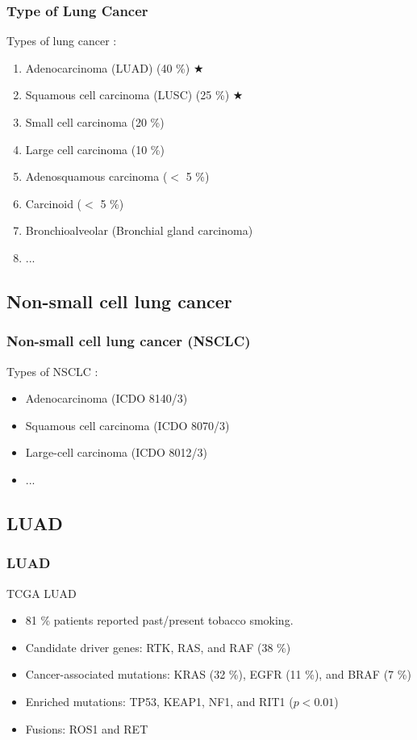 \documentclass{beamer}
\begin{document}
    \begin{frame}
        \frametitle{Type of Lung Cancer}

        Types of lung cancer \cite{lung2}:
        \begin{enumerate}
            \item Adenocarcinoma (LUAD) (40 \%) $\bigstar$
            \item Squamous cell carcinoma (LUSC) (25 \%) $\bigstar$
            \item Small cell carcinoma (20 \%)
            \item Large cell carcinoma (10 \%)
            \item Adenosquamous carcinoma ($<$ 5 \%)
            \item Carcinoid ($<$ 5 \%)
            \item Bronchioalveolar (Bronchial gland carcinoma)
            \item ...
        \end{enumerate}
    \end{frame}

    \subsection{Non-small cell lung cancer}
    \begin{frame}
        \frametitle{Non-small cell lung cancer (NSCLC)}

        Types of NSCLC \cite{NSCLC-1}:
        \begin{itemize}
            \item Adenocarcinoma (ICDO 8140/3)
            \item Squamous cell carcinoma (ICDO 8070/3)
            \item Large-cell carcinoma (ICDO 8012/3)
            \item ...
        \end{itemize}
    \end{frame}

    \subsection{LUAD}
    \begin{frame}
        \frametitle{LUAD}

        TCGA LUAD \cite{LUAD-1}
        \begin{itemize}
            \item 81 \% patients reported past/present tobacco smoking.
            \item Candidate driver genes: RTK, RAS, and RAF (38 \%)
            \item Cancer-associated mutations: KRAS (32 \%), EGFR (11 \%), and BRAF (7 \%)
            \item Enriched mutations: TP53, KEAP1, NF1, and RIT1 ($p < 0.01$)
            \item Fusions: ROS1 and RET
        \end{itemize}
    \end{frame}
\end{document}
